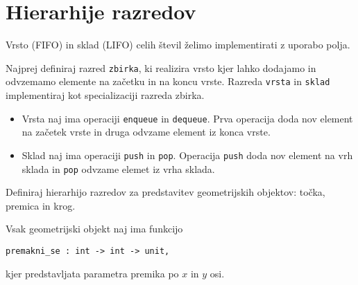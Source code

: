 \section{Hierarhije razredov}





\begin{ex}
Vrsto (FIFO) in sklad (LIFO) celih \v stevil \v zelimo implementirati z uporabo polja. 

Najprej definiraj razred \lstinline{zbirka}, ki realizira vrsto kjer lahko dodajamo in odvzemamo elemente na za\v cetku in na koncu vrste. 
Razreda \lstinline{vrsta} in \lstinline{sklad} implementiraj kot specializaciji razreda zbirka. 

\begin{itemize}
\item Vrsta naj ima operaciji \texttt{enqueue} in \texttt{dequeue}. Prva operacija doda nov element na za\v cetek vrste in druga odvzame element iz konca vrste. 

\item Sklad naj ima operaciji \texttt{push} in \texttt{pop}. Operacija \texttt{push} doda nov element na vrh sklada in \texttt{pop} odvzame elemet iz vrha sklada.
\end{itemize}
\end{ex}





\begin{ex}
Definiraj hierarhijo razredov za predstavitev geometrijskih objektov: to\v cka, premica in krog. 

Vsak geometrijski objekt naj ima funkcijo
\begin{lstlisting}
premakni_se : int -> int -> unit,
\end{lstlisting}
kjer predstavljata parametra premika po $x$ in $y$ osi. 
\end{ex}






